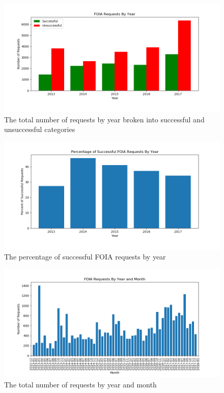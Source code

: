 \documentclass{article}
\begin{document}
\begin{figure}[H]
	\centering
	\includegraphics[width=1\textwidth]{yearly_breakdown}
	\caption{The total number of requests by year broken into successful and unsuccessful categories}
	\label{fig:yearly_breakdown}
\end{figure}

\begin{figure}[H]
	\centering
	\includegraphics[width=1\textwidth]{yearly_percent_successful}
	\caption{The percentage of successful FOIA requests by year}
	\label{fig:yearly_percent_successful}
\end{figure}

\begin{figure}[H]
	\centering
	\includegraphics[width=1\textwidth]{monthly_total}
	\caption{The total number of requests by year and month}
	\label{fig:monthly_total}
\end{figure}
\end{document}
